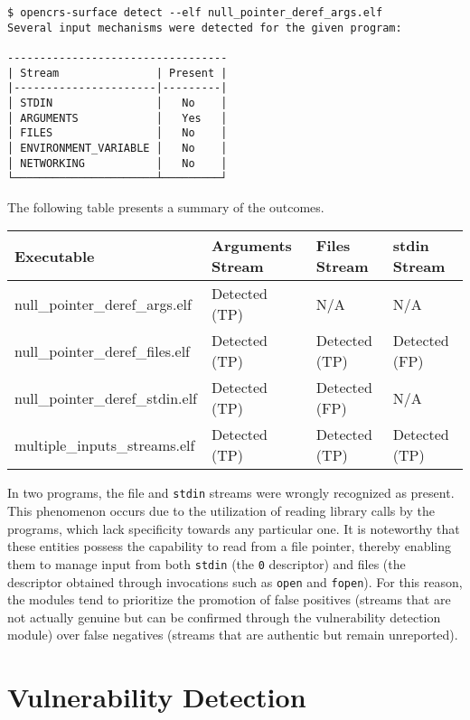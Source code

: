 \documentclass[../main.tex]{subfiles}
\begin{document}
\begin{tiny}
\begin{verbatim}
$ opencrs-surface detect --elf null_pointer_deref_args.elf
Several input mechanisms were detected for the given program:

----------------------------------
| Stream               | Present |
|----------------------|---------|
│ STDIN                │   No    │
│ ARGUMENTS            │   Yes   │
│ FILES                │   No    │
│ ENVIRONMENT_VARIABLE │   No    │
│ NETWORKING           │   No    │
└──────────────────────┴─────────┘
\end{verbatim}
\end{tiny}

The following table presents a summary of the outcomes.

\begin{table}[]
\begin{tabular}{|l|l|l|l|}
\hline
Executable                      & Arguments Stream & Files Stream  & stdin Stream  \\ \hline
null\_pointer\_deref\_args.elf  & Detected (TP)    & N/A           & N/A           \\ \hline
null\_pointer\_deref\_files.elf & Detected (TP)    & Detected (TP) & Detected (FP) \\ \hline
null\_pointer\_deref\_stdin.elf & Detected (TP)    & Detected (FP) & N/A           \\ \hline
multiple\_inputs\_streams.elf   & Detected (TP)    & Detected (TP) & Detected (TP) \\ \hline
\end{tabular}
\end{table}

In two programs, the file and \texttt{stdin} streams were wrongly recognized as
present. This phenomenon occurs due to the utilization of reading library calls
by the programs, which lack specificity towards any particular one. It is
noteworthy that these entities possess the capability to read from a file
pointer, thereby enabling them to manage input from both \texttt{stdin} (the
\texttt{0} descriptor) and files (the descriptor obtained through invocations
such as \texttt{open} and \texttt{fopen}). For this reason, the modules tend to
prioritize the promotion of false positives (streams that are not actually
genuine but can be confirmed through the vulnerability detection module) over
false negatives (streams that are authentic but remain unreported).

\hypertarget{vulnerability-detection}{%
  \section{Vulnerability Detection}\label{vulnerability-detection}}
\end{document}
